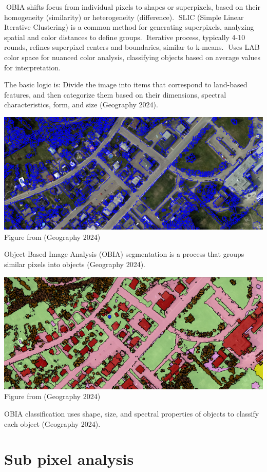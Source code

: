 \documentclass[
  letterpaper,
  DIV=11,
  numbers=noendperiod]{scrreprt}
\begin{document}
OBIA shifts focus from individual pixels to shapes or superpixels,
based on their homogeneity (similarity) or heterogeneity (difference).
SLIC (Simple Linear Iterative Clustering) is a common method for
generating superpixels, analyzing spatial and color distances to define
groups. Iterative process, typically 4-10 rounds, refines superpixel
centers and boundaries, similar to k-means. Uses LAB color space for
nuanced color analysis, classifying objects based on average values for
interpretation.

The basic logic is: Divide the image into items that correspond to
land-based features, and then categorize them based on their dimensions,
spectral characteristics, form, and size (Geography 2024).

\includegraphics{OBIA1.png} Figure from (Geography 2024)

Object-Based Image Analysis (OBIA) segmentation is a process that groups
similar pixels into objects (Geography 2024).

\includegraphics{OBIA2.png} Figure from (Geography 2024)

OBIA classification uses shape, size, and spectral properties of objects
to classify each object (Geography 2024).

\section{Sub pixel analysis}\label{sub-pixel-analysis}
\end{document}
